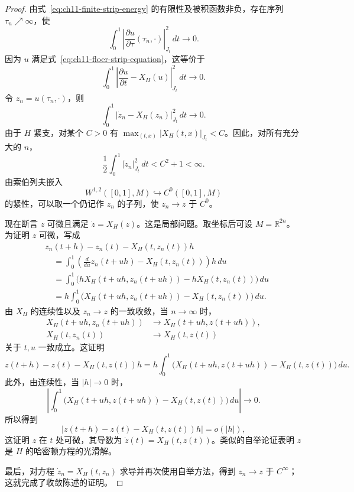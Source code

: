 \begin{proof}
由式~\eqref{eq:ch11-finite-strip-energy} 的有限性及被积函数非负，存在序列
$\tau_n\nearrow\infty$，使
\[
 \int_0^1
 \left|\frac{\partial u}{\partial\tau}(\tau_n,\mathord\cdot)\right|_{J_t}^2
 \,dt\longrightarrow0.
\]
因为 $u$ 满足式~\eqref{eq:ch11-floer-strip-equation}，这等价于
\begin{equation}
 \int_0^1
 \left|\frac{\partial u}{\partial t}-X_H(u)\right|_{J_t}^2
 \,dt\longrightarrow0.
 \label{eq:ch11-strip-slices-approximate-chords}
\end{equation}
令 $z_n=u(\tau_n,\mathord\cdot)$，则
\begin{equation}
 \int_0^1|\dot z_n-X_H(z_n)|_{J_t}^2\,dt\longrightarrow0.
 \label{eq:ch11-paths-approximate-hamiltonian}
\end{equation}
由于 $H$ 紧支，对某个 $C>0$ 有
$\max_{(t,x)}|X_H(t,x)|_{J_t}<C$。因此，对所有充分大的 $n$，
\begin{equation}
 \frac12\int_0^1|\dot z_n|_{J_t}^2\,dt<C^2+1<\infty.
 \label{eq:ch11-uniform-w12-path-bound}
\end{equation}
由索伯列夫嵌入
\[
 W^{1,2}([0,1],M)\hookrightarrow C^0([0,1],M)
\]
的紧性，可以取一个仍记作 $z_n$ 的子列，使 $z_n\to z$ 于 $C^0$。

现在断言 $z$ 可微且满足 $\dot z=X_H(z)$。这是局部问题。取坐标后可设
$M=\mathbb R^{2n}$。为证明 $z$ 可微，写成
\[
 \begin{aligned}
 &z_n(t+h)-z_n(t)-X_H(t,z_n(t))h\\
 &\quad=\int_0^1
 \left(\frac{d}{du}z_n(t+uh)-X_H(t,z_n(t))\right)h\,du\\
 &\quad=\int_0^1
 \bigl(hX_H(t+uh,z_n(t+uh))-hX_H(t,z_n(t))\bigr)\,du\\
 &\quad=h\int_0^1
 \bigl(X_H(t+uh,z_n(t+uh))-X_H(t,z_n(t))\bigr)\,du.
 \end{aligned}
\]
由 $X_H$ 的连续性以及 $z_n\to z$ 的一致收敛，当 $n\to\infty$ 时，
\[
 \begin{aligned}
 X_H(t+uh,z_n(t+uh))&\longrightarrow X_H(t+uh,z(t+uh)),\\
 X_H(t,z_n(t))&\longrightarrow X_H(t,z(t))
 \end{aligned}
\]
关于 $t,u$ 一致成立。这证明
\[
 z(t+h)-z(t)-X_H(t,z(t))h
 =h\int_0^1
 \bigl(X_H(t+uh,z(t+uh))-X_H(t,z(t))\bigr)\,du.
\]
此外，由连续性，当 $|h|\to0$ 时，
\[
 \left|\int_0^1
 \bigl(X_H(t+uh,z(t+uh))-X_H(t,z(t))\bigr)\,du\right|
 \longrightarrow0.
\]
所以得到
\[
 |z(t+h)-z(t)-X_H(t,z(t))h|=o(|h|),
\]
这证明 $z$ 在 $t$ 处可微，其导数为 $\dot z(t)=X_H(t,z(t))$。类似的自举论证表明 $z$ 是 $H$ 的哈密顿方程的光滑解。

最后，对方程 $\dot z_n=X_H(t,z_n)$ 求导并再次使用自举方法，得到
$z_n\to z$ 于 $C^\infty$；这就完成了收敛陈述的证明。
\end{proof}

